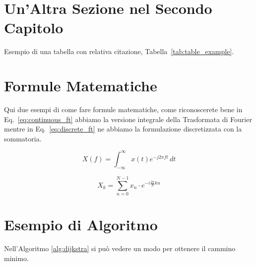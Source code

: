 \section{Un'Altra Sezione nel Secondo Capitolo}
Esempio di una tabella con relativa citazione, Tabella~\ref{tab:table_example}.


\section{Formule Matematiche}
Qui due esempi di come fare formule matematiche, come riconoscerete bene in Eq.~\ref{eq:continuous_ft} abbiamo la versione integrale della Trasformata di Fourier mentre in Eq.~\ref{eq:discrete_ft} ne abbiamo la formulazione discretizzata con la sommatoria.

\begin{equation}
    \label{eq:continuous_ft}
    X(f) = \int_{-\infty}^{\infty} x(t) e^{-j 2\pi f t} \, dt
\end{equation}


\begin{equation}
    \label{eq:discrete_ft}
    X_k = \sum_{n=0}^{N-1} x_n \cdot e^{-i \frac{2\pi}{N} k n}
\end{equation}

\section{Esempio di Algoritmo }
Nell'Algoritmo \ref{alg:dijkstra} si può vedere un modo per ottenere il cammino minimo.


